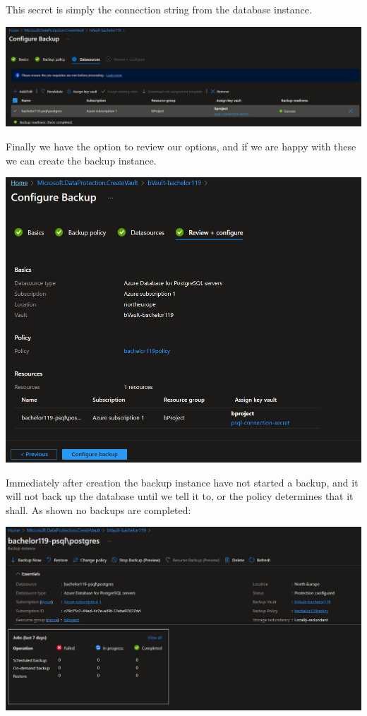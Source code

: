 This secret is simply the connection string from the database instance. 

\includegraphics[width=15cm, keepaspectratio]{figures/postgresaasmund/4.PNG}


Finally we have the option to review our options, and if we are happy with these we can create the backup instance. 

\includegraphics[width=15cm, keepaspectratio]{figures/postgresaasmund/5.PNG}

Immediately after creation the backup instance have not started a backup, and it will not back up the database until we tell it to, or the policy determines that it shall. As shown no backups are completed:

\includegraphics[width=15cm, keepaspectratio]{figures/postgresaasmund/6.PNG}

